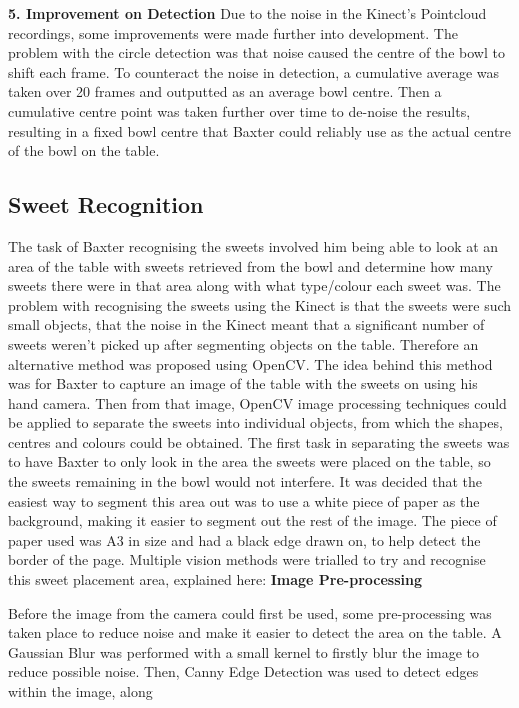 \newline
\newline
\textbf{5. Improvement on Detection}
\newline
Due to the noise in the Kinect's Pointcloud recordings, some improvements were made further into development. The problem with the circle detection was that noise caused the centre of the bowl to shift each frame. To counteract the noise in detection, a cumulative average was taken over 20 frames and outputted as an average bowl centre. Then a cumulative centre point was taken further over time to de-noise the results, resulting in a fixed bowl centre that Baxter could reliably use as the actual centre of the bowl on the table.
\subsection{Sweet Recognition}
The task of Baxter recognising the sweets involved him being able to look at an area of the table with sweets retrieved from the bowl and determine how many sweets there were in that area along with what type/colour each sweet was. The problem with recognising the sweets using the Kinect is that the sweets were such small objects, that the noise in the Kinect meant that a significant number of sweets weren't picked up after segmenting objects on the table. Therefore an alternative method was proposed using OpenCV. The idea behind this method was for Baxter to capture an image of the table with the sweets on using his hand camera. Then from that image, OpenCV image processing techniques could be applied to separate the sweets into individual objects, from which the shapes, centres and colours could be obtained.
\newline\newline
The first task in separating the sweets was to have Baxter to only look in the area the sweets were placed on the table, so the sweets remaining in the bowl would not interfere. It was decided that the easiest way to segment this area out was to use a white piece of paper as the background, making it easier to segment out the rest of the image. The piece of paper used was A3 in size and had a black edge drawn on, to help detect the border of the page. Multiple vision methods were trialled to try and recognise this sweet placement area, explained here:
\newline
\newline
\textbf{Image Pre-processing}
\newline
\begin{minipage}[t]{0.30\textwidth}
\raggedright
\smallskip
Before the image from the camera could first be used, some pre-processing was taken place to reduce noise and make it easier to detect the area on the table. A Gaussian Blur was performed with a small kernel to firstly blur the image to reduce possible noise. Then, Canny Edge Detection was used to detect edges within the image, along 
\smallskip
\end{minipage}
